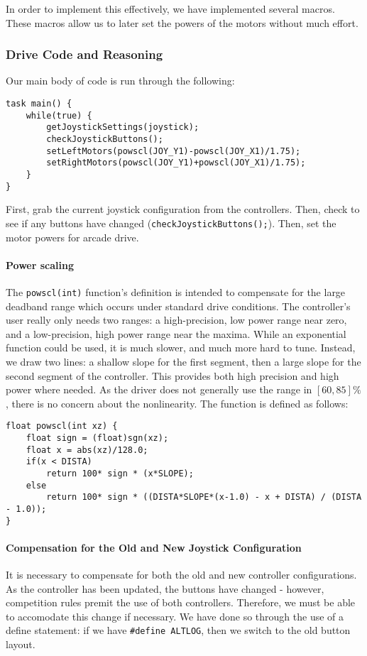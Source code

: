 \documentclass{article}
\begin{document}
In order to implement this effectively, we have implemented several macros. These macros allow us to later set the powers of the motors without much effort. 

\subsubsection{Drive Code and Reasoning}

Our main body of code is run through the following:

\begin{lstlisting}[tabsize=4]
task main() {
	while(true) {
		getJoystickSettings(joystick);
		checkJoystickButtons();
		setLeftMotors(powscl(JOY_Y1)-powscl(JOY_X1)/1.75);
		setRightMotors(powscl(JOY_Y1)+powscl(JOY_X1)/1.75);
	}
}
\end{lstlisting}

First, grab the current joystick configuration from the controllers. Then, check to see if any buttons have changed (\lstinline{checkJoystickButtons();}{}). Then, set the motor powers for arcade drive. 

\paragraph{Power scaling} The \lstinline{powscl(int)}{} function's definition is intended to compensate for the large deadband range which occurs under standard drive conditions. The controller's user really only needs two ranges: a high-precision, low power range near zero, and a low-precision, high power range near the maxima. While an exponential function could be used, it is much slower, and much more hard to tune. Instead, we draw two lines: a shallow slope for the first segment, then a large slope for the second segment of the controller. This provides both high precision and high power where needed. As the driver does not generally use the range in $[60,85]\%$, there is no concern about the nonlinearity. The function is defined as follows:

\begin{lstlisting}[tabsize=4]
float powscl(int xz) {
	float sign = (float)sgn(xz);
	float x = abs(xz)/128.0;
	if(x < DISTA)
		return 100* sign * (x*SLOPE);
	else
		return 100* sign * ((DISTA*SLOPE*(x-1.0) - x + DISTA) / (DISTA - 1.0));
}
\end{lstlisting}

\paragraph{Compensation for the Old and New Joystick Configuration} It is necessary to compensate for both the old and new controller configurations. As the controller has been updated, the buttons have changed - however, competition rules premit the use of both controllers. Therefore, we must be able to accomodate this change if necessary. We have done so through the use of a define statement: if we have \lstinline{#define ALTLOG}{}, then we switch to the old button layout.
\end{document}
